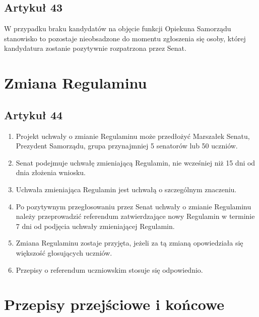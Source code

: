 \documentclass[14pt]{article}
\newenvironment{ustepy}{%
	\begin{enumerate}[leftmargin=1.5em, itemindent=1pt, labelwidth=1em, itemsep=5pt]
	}{%
	\end{enumerate}
}
\begin{document}
\subsection*{Artykuł 43}
W przypadku braku kandydatów na objęcie funkcji Opiekuna Samorządu stanowisko to pozostaje nieobsadzone do momentu zgłoszenia się osoby, której kandydatura zostanie pozytywnie rozpatrzona przez Senat.
\newpage
\section{Zmiana Regulaminu}
\subsection*{Artykuł 44}
\begin{ustepy}
	\item Projekt uchwały o zmianie Regulaminu może przedłożyć Marszałek Senatu, Prezydent Samorządu, grupa przynajmniej 5 senatorów lub 50 uczniów.
	\item Senat podejmuje uchwałę zmieniającą Regulamin, nie wcześniej niż 15 dni od dnia złożenia wniosku.
	\item Uchwała zmieniająca Regulamin jest uchwałą o szczególnym znaczeniu.
	\item Po pozytywnym przegłosowaniu przez Senat uchwały o zmianie Regulaminu należy przeprowadzić referendum zatwierdzające nowy Regulamin w terminie 7 dni od podjęcia uchwały zmieniającej Regulamin.
	\item Zmiana Regulaminu zostaje przyjęta, jeżeli za tą zmianą opowiedziała się większość głosujących uczniów.
	\item Przepisy o referendum uczniowskim stosuje się odpowiednio.
\end{ustepy}
\section{Przepisy przejściowe i końcowe}
\end{document}
